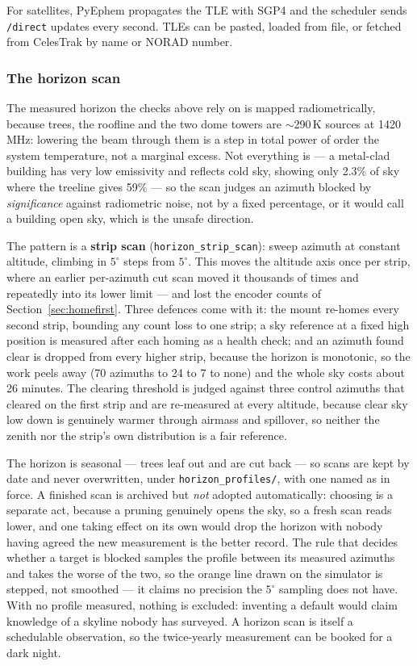 \documentclass[11pt,a4paper]{article}
\begin{document}
For satellites, PyEphem propagates the TLE with SGP4 \cite{sgp4} and the scheduler sends \texttt{/direct} updates every second. TLEs can be pasted, loaded from file, or fetched from CelesTrak by name or NORAD number.

\subsubsection{The horizon scan}
\label{sec:horizon}

The measured horizon the checks above rely on is mapped radiometrically, because trees, the roofline and the two dome towers are $\sim$290\,K sources at 1420\,MHz: lowering the beam through them is a step in total power of order the system temperature, not a marginal excess. Not everything is --- a metal-clad building has very low emissivity and reflects cold sky, showing only 2.3\% of sky where the treeline gives 59\% --- so the scan judges an azimuth blocked by \emph{significance} against radiometric noise, not by a fixed percentage, or it would call a building open sky, which is the unsafe direction.

The pattern is a \textbf{strip scan} (\texttt{horizon\_strip\_scan}): sweep azimuth at constant altitude, climbing in $5^\circ$ steps from $5^\circ$. This moves the altitude axis once per strip, where an earlier per-azimuth cut scan moved it thousands of times and repeatedly into its lower limit --- and lost the encoder counts of Section~\ref{sec:homefirst}. Three defences come with it: the mount re-homes every second strip, bounding any count loss to one strip; a sky reference at a fixed high position is measured after each homing as a health check; and an azimuth found clear is dropped from every higher strip, because the horizon is monotonic, so the work peels away (70 azimuths to 24 to 7 to none) and the whole sky costs about 26 minutes. The clearing threshold is judged against three control azimuths that cleared on the first strip and are re-measured at every altitude, because clear sky low down is genuinely warmer through airmass and spillover, so neither the zenith nor the strip's own distribution is a fair reference.

The horizon is seasonal --- trees leaf out and are cut back --- so scans are kept by date and never overwritten, under \texttt{horizon\_profiles/}, with one named as in force. A finished scan is archived but \emph{not} adopted automatically: choosing is a separate act, because a pruning genuinely opens the sky, so a fresh scan reads lower, and one taking effect on its own would drop the horizon with nobody having agreed the new measurement is the better record. The rule that decides whether a target is blocked samples the profile between its measured azimuths and takes the worse of the two, so the orange line drawn on the simulator is stepped, not smoothed --- it claims no precision the $5^\circ$ sampling does not have. With no profile measured, nothing is excluded: inventing a default would claim knowledge of a skyline nobody has surveyed. A horizon scan is itself a schedulable observation, so the twice-yearly measurement can be booked for a dark night.
\end{document}
